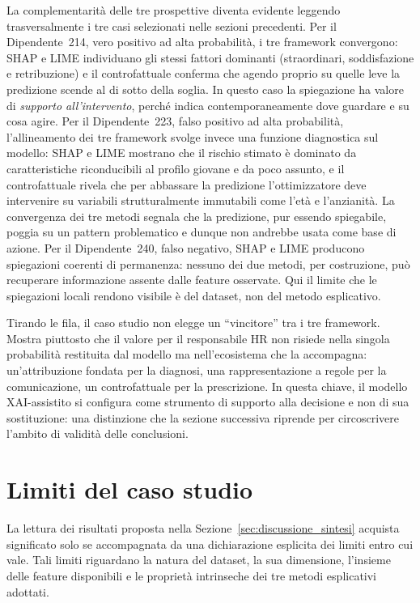 La complementarità delle tre prospettive diventa evidente leggendo trasversalmente i tre casi selezionati nelle sezioni precedenti. Per il Dipendente~214, vero positivo ad alta probabilità, i tre framework convergono: SHAP e LIME individuano gli stessi fattori dominanti (straordinari, soddisfazione e retribuzione) e il controfattuale conferma che agendo proprio su quelle leve la predizione scende al di sotto della soglia. In questo caso la spiegazione ha valore di \emph{supporto all'intervento}, perché indica contemporaneamente dove guardare e su cosa agire. Per il Dipendente~223, falso positivo ad alta probabilità, l'allineamento dei tre framework svolge invece una funzione diagnostica sul modello: SHAP e LIME mostrano che il rischio stimato è dominato da caratteristiche riconducibili al profilo giovane e da poco assunto, e il controfattuale rivela che per abbassare la predizione l'ottimizzatore deve intervenire su variabili strutturalmente immutabili come l'età e l'anzianità. La convergenza dei tre metodi segnala che la predizione, pur essendo spiegabile, poggia su un pattern problematico e dunque non andrebbe usata come base di azione. Per il Dipendente~240, falso negativo, SHAP e LIME producono spiegazioni coerenti di permanenza: nessuno dei due metodi, per costruzione, può recuperare informazione assente dalle feature osservate. Qui il limite che le spiegazioni locali rendono visibile è del dataset, non del metodo esplicativo.

Tirando le fila, il caso studio non elegge un ``vincitore'' tra i tre framework. Mostra piuttosto che il valore per il responsabile HR non risiede nella singola probabilità restituita dal modello ma nell'ecosistema che la accompagna: un'attribuzione fondata per la diagnosi, una rappresentazione a regole per la comunicazione, un controfattuale per la prescrizione. In questa chiave, il modello XAI-assistito si configura come strumento di supporto alla decisione e non di sua sostituzione: una distinzione che la sezione successiva riprende per circoscrivere l'ambito di validità delle conclusioni.

\section{Limiti del caso studio}
\label{sec:discussione_limiti}

La lettura dei risultati proposta nella Sezione~\ref{sec:discussione_sintesi} acquista significato solo se accompagnata da una dichiarazione esplicita dei limiti entro cui vale. Tali limiti riguardano la natura del dataset, la sua dimensione, l'insieme delle feature disponibili e le proprietà intrinseche dei tre metodi esplicativi adottati.

